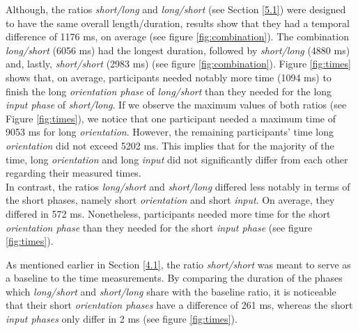 Although, the ratios \textit{short/long} and \textit{long/short} (see Section \ref{5.1}) were designed to have the same overall length/duration, results show that they had a temporal difference of 1176 ms, on average (see figure \ref{fig:combination}). The combination \textit{long/short} (6056 ms) had the longest duration, followed by \textit{short/long} (4880 ms) and, lastly, \textit{short/short} (2983 ms) (see figure \ref{fig:combination}). Figure \ref{fig:times} shows that, on average, participants needed notably more time (1094 ms) to finish the long \textit{orientation phase} of \textit{long/short} than they needed for the long \textit{input phase} of \textit{short/long}. If we observe the maximum values of both ratios (see Figure \ref{fig:times}), we notice that one participant needed a maximum time of 9053 ms for long \textit{orientation}. However, the remaining participants' time long \textit{orientation} did not exceed 5202 ms. This implies that for the majority of the time, long \textit{orientation} and long \textit{input} did not significantly differ from each other regarding their measured times. \\
In contrast, the ratios \textit{long/short} and \textit{short/long} differed less notably in terms of the short phases, namely short \textit{orientation} and short \textit{input}. On average, they differed in 572 ms. Nonetheless, participants needed more time for the short \textit{orientation phase} than they needed for the short \textit{input phase} (see figure \ref{fig:times}).

As mentioned earlier in Section \ref{4.1}, the ratio \textit{short/short} was meant to serve as a baseline to the time measurements. By comparing the duration of the phases which \textit{long/short} and \textit{short/long} share with the baseline ratio, it is noticeable that their short \textit{orientation phases} have a difference of 261 ms, whereas the short \textit{input phases} only differ in 2 ms (see figure \ref{fig:times}).  

